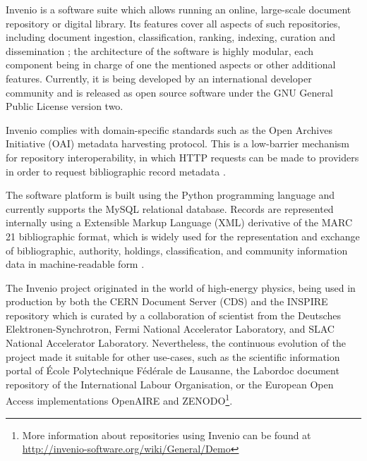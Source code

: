 
Invenio \cite{ref:invenio} is a software suite which allows running an online,
large-scale document repository or digital library. Its features cover all
aspects of such repositories, including document ingestion, classification,
ranking, indexing, curation and dissemination \cite{ref:kaplun, ref:glauner};
the architecture of the software is highly modular, each component being in
charge of one the mentioned aspects or other additional features. Currently, it
is being developed by an international developer community and is released as
open source software under the GNU General Public License version two.

Invenio complies with domain-specific standards such as the Open Archives
Initiative (OAI) metadata harvesting protocol. This is a low-barrier mechanism for
repository interoperability, in which HTTP requests can be made to providers in
order to request bibliographic record metadata \cite{ref:oai}.

The software platform is built using the Python programming language and
currently supports the MySQL relational database. Records are represented
internally using a Extensible Markup Language (XML) derivative of the MARC 21
bibliographic format, which is widely used for the representation and exchange
of bibliographic, authority, holdings, classification, and community
information data in machine-readable form \cite{ref:marc}.

The Invenio project originated in the world of high-energy physics, being used
in production by both the CERN Document Server (CDS) and the INSPIRE repository
which is curated by a collaboration of scientist from the Deutsches
Elektronen-Synchrotron, Fermi National Accelerator Laboratory, and SLAC
National Accelerator Laboratory. Nevertheless, the continuous evolution of the
project made it suitable for other use-cases, such as the scientific
information portal of \'{E}cole Polytechnique F\'{e}d\'{e}rale de Lausanne, the
Labordoc document repository of the International Labour Organisation, or the
European Open Access implementations OpenAIRE and ZENODO\footnote{More
information about repositories using Invenio can be found at
\url{http://invenio-software.org/wiki/General/Demo}}.
